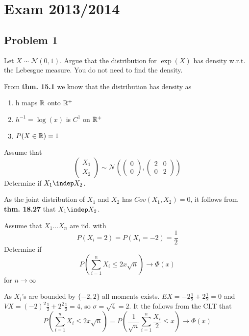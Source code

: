 \section{Exam 2013/2014} %
\label{sec:exam_2013_2014}
\subsection{Problem 1} %
\begin{problem}
Let \(X\sim\mathcal{N}(0,1)\).  Argue that the distribution for \(\exp(X)\) has density w.r.t. the Lebesgue measure. You do not need to find the density.
\end{problem}
\begin{solution}
From \textbf{thm. 15.1} we know that the distribution has density as
\begin{enumerate}
	\item h maps \({\mathbb{R}}\) onto \({\mathbb{R}}^+\)
	\item \(h^{-1}=\log(x)\) is \(C^1\)  on \({\mathbb{R}}^+\)
	\item \(P(X\in {\mathbb{R}})=1\)
\end{enumerate}
\end{solution}
\begin{problem}
Assume that
\[
	\begin{pmatrix}
	X_1 \\ X_2
	\end{pmatrix}
	\sim \mathcal{N}\left(
	\begin{pmatrix}
	0 \\0
	\end{pmatrix},
	\begin{pmatrix}
	2 & 0 \\
	0 & 2
	\end{pmatrix}
	\right)
\]
Determine if \(X_1\indep X_2\).
\end{problem}
\begin{solution}
As the joint distribution of \(X_1\) and \(X_2\) has \(Cov(X_1,X_2)=0\), it follows from \textbf{thm. 18.27} that \(X_1\indep X_2\).
\end{solution}
\begin{problem}
Assume that \(X_1\ldots X_n\) are iid. with
\[
	P(X_i=2)=P(X_i=-2)=\frac{1}{2}
\]
Determine if
\[
	P\left(\sum_{i=1}^n X_i \leq 2x\sqrt{n}\right) \rightarrow\Phi(x)
\]
for \(n \rightarrow\infty\)
\end{problem}
\begin{solution}
As \(X_i\)'s are bounded by \(\{-2,2\}\) all moments exists. \(EX=-2\frac{1}{2}+2\frac{1}{2}=0\) and \(VX=(-2)^2\frac{1}{2}+2^2\frac{1}{2}=4\), so \(\sigma=\sqrt{4}=2\). It the follows from the CLT that
\[
	P\left(\sum_{i=1}^n X_i \leq 2x\sqrt{n}\right) = P\left(\frac{1}{\sqrt{n}}\sum_{i=1}^n \frac{X_i}{2}\leq x\right)\rightarrow\Phi(x)
\]

\end{solution}
